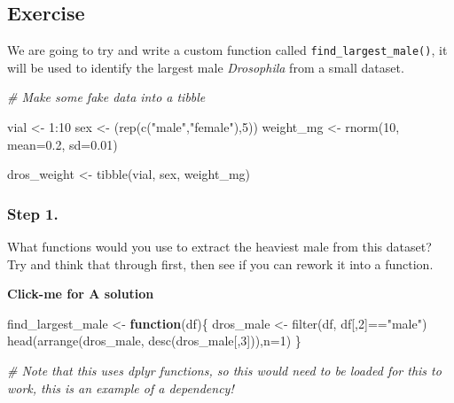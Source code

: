\documentclass[
]{book}
\newenvironment{Shaded}{\begin{snugshade}}{\end{snugshade}}
\newcommand{\AttributeTok}[1]{\textcolor[rgb]{0.77,0.63,0.00}{#1}}
\newcommand{\CommentTok}[1]{\textcolor[rgb]{0.56,0.35,0.01}{\textit{#1}}}
\newcommand{\ControlFlowTok}[1]{\textcolor[rgb]{0.13,0.29,0.53}{\textbf{#1}}}
\newcommand{\DecValTok}[1]{\textcolor[rgb]{0.00,0.00,0.81}{#1}}
\newcommand{\FloatTok}[1]{\textcolor[rgb]{0.00,0.00,0.81}{#1}}
\newcommand{\FunctionTok}[1]{\textcolor[rgb]{0.00,0.00,0.00}{#1}}
\newcommand{\NormalTok}[1]{#1}
\newcommand{\OtherTok}[1]{\textcolor[rgb]{0.56,0.35,0.01}{#1}}
\newcommand{\SpecialCharTok}[1]{\textcolor[rgb]{0.00,0.00,0.00}{#1}}
\newcommand{\StringTok}[1]{\textcolor[rgb]{0.31,0.60,0.02}{#1}}
\begin{document}
\hypertarget{exercise}{%
\subsection{Exercise}\label{exercise}}

We are going to try and write a custom function called \texttt{find\_largest\_male()}, it will be used to identify the largest male \emph{Drosophila} from a small dataset.

\begin{Shaded}
\begin{Highlighting}[]
\CommentTok{\# Make some fake data into a tibble}

\NormalTok{vial }\OtherTok{\textless{}{-}} \DecValTok{1}\SpecialCharTok{:}\DecValTok{10}
\NormalTok{sex }\OtherTok{\textless{}{-}}\NormalTok{ (}\FunctionTok{rep}\NormalTok{(}\FunctionTok{c}\NormalTok{(}\StringTok{"male"}\NormalTok{,}\StringTok{"female"}\NormalTok{),}\DecValTok{5}\NormalTok{))}
\NormalTok{weight\_mg }\OtherTok{\textless{}{-}} \FunctionTok{rnorm}\NormalTok{(}\DecValTok{10}\NormalTok{, }\AttributeTok{mean=}\FloatTok{0.2}\NormalTok{, }\AttributeTok{sd=}\FloatTok{0.01}\NormalTok{)}

\NormalTok{dros\_weight }\OtherTok{\textless{}{-}} \FunctionTok{tibble}\NormalTok{(vial, sex, weight\_mg)}
\end{Highlighting}
\end{Shaded}

\hypertarget{step-1.}{%
\subsubsection{Step 1.}\label{step-1.}}

What functions would you use to extract the heaviest male from this dataset? Try and think that through first, then see if you can rework it into a function.

\textbf{Click-me for A solution}

\begin{Shaded}
\begin{Highlighting}[]
\NormalTok{find\_largest\_male }\OtherTok{\textless{}{-}} \ControlFlowTok{function}\NormalTok{(df)\{}
\NormalTok{  dros\_male }\OtherTok{\textless{}{-}} \FunctionTok{filter}\NormalTok{(df, df[,}\DecValTok{2}\NormalTok{]}\SpecialCharTok{==}\StringTok{"male"}\NormalTok{)}
  \FunctionTok{head}\NormalTok{(}\FunctionTok{arrange}\NormalTok{(dros\_male, }\FunctionTok{desc}\NormalTok{(dros\_male[,}\DecValTok{3}\NormalTok{])),}\AttributeTok{n=}\DecValTok{1}\NormalTok{)}
\NormalTok{\}}

\CommentTok{\# Note that this uses dplyr functions, so this would need to be loaded for this to work, this is an example of a dependency!}
\end{Highlighting}
\end{Shaded}
\end{document}
